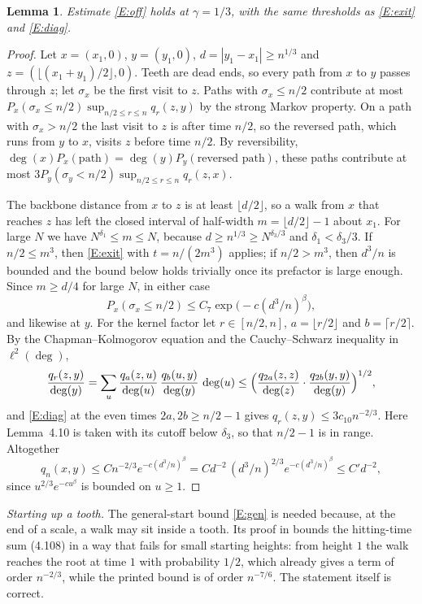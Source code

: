 \documentclass[11pt]{amsart}
\newtheorem{lemma}[theorem]{Lemma}
\theoremstyle{remark}
\numberwithin{equation}{section}
\begin{document}
\begin{lemma}\label{lem:off}
Estimate \ref{E:off} holds at $\gamma=1/3$, with the same thresholds as \ref{E:exit} and \ref{E:diag}.
\end{lemma}

\begin{proof}
Let $x=(x_1,0)$, $y=(y_1,0)$, $d=|y_1-x_1|\ge n^{1/3}$ and $z=(\lfloor(x_1+y_1)/2\rfloor,0)$. Teeth are dead ends, so every path from $x$ to $y$ passes through $z$; let $\sigma_x$ be the first visit to $z$. Paths with $\sigma_x\le n/2$ contribute at most $P_x(\sigma_x\le n/2)\sup_{n/2\le r\le n}q_r(z,y)$ by the strong Markov property. On a path with $\sigma_x>n/2$ the last visit to $z$ is after time $n/2$, so the reversed path, which runs from $y$ to $x$, visits $z$ before time $n/2$. By reversibility, $\deg(x)P_x(\text{path})=\deg(y)P_y(\text{reversed path})$, these paths contribute at most $3P_y(\sigma_y<n/2)\sup_{n/2\le r\le n}q_r(z,x)$.

The backbone distance from $x$ to $z$ is at least $\lfloor d/2\rfloor$, so a walk from $x$ that reaches $z$ has left the closed interval of half-width $m=\lfloor d/2\rfloor-1$ about $x_1$. For large $N$ we have $N^{\delta_1}\le m\le N$, because $d\ge n^{1/3}\ge N^{\delta_3/3}$ and $\delta_1<\delta_3/3$. If $n/2\le m^3$, then \ref{E:exit} with $t=n/(2m^3)$ applies; if $n/2>m^3$, then $d^3/n$ is bounded and the bound below holds trivially once its prefactor is large enough. Since $m\ge d/4$ for large $N$, in either case
\[
P_x(\sigma_x\le n/2)\le C_7\exp\bigl(-c(d^3/n)^{\beta}\bigr),
\]
and likewise at $y$. For the kernel factor let $r\in[n/2,n]$, $a=\lfloor r/2\rfloor$ and $b=\lceil r/2\rceil$. By the Chapman--Kolmogorov equation and the Cauchy--Schwarz inequality in $\ell^2(\deg)$,
\[
\frac{q_r(z,y)}{\deg(y)}=\sum_u\frac{q_a(z,u)}{\deg(u)}\,\frac{q_b(u,y)}{\deg(y)}\,\deg(u)\le\Bigl(\frac{q_{2a}(z,z)}{\deg(z)}\cdot\frac{q_{2b}(y,y)}{\deg(y)}\Bigr)^{1/2},
\]
and \ref{E:diag} at the even times $2a,2b\ge n/2-1$ gives $q_r(z,y)\le3c_{10}n^{-2/3}$. Here Lemma~4.10 is taken with its cutoff below $\delta_3$, so that $n/2-1$ is in range. Altogether
\[
q_n(x,y)\le Cn^{-2/3}e^{-c(d^3/n)^\beta}=Cd^{-2}\,(d^3/n)^{2/3}e^{-c(d^3/n)^\beta}\le C'd^{-2},
\]
since $u^{2/3}e^{-cu^\beta}$ is bounded on $u\ge1$.
\end{proof}

\emph{Starting up a tooth.} The general-start bound \ref{E:gen} is needed because, at the end of a scale, a walk may sit inside a tooth. Its proof in \cite{DNNS} bounds the hitting-time sum (4.108) in a way that fails for small starting heights: from height $1$ the walk reaches the root at time $1$ with probability $1/2$, which already gives a term of order $n^{-2/3}$, while the printed bound is of order $n^{-7/6}$. The statement itself is correct.
\end{document}
